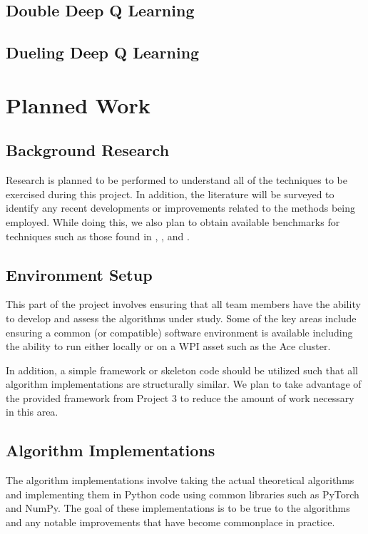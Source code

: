 \documentclass[conference]{IEEEtran}
\begin{document}
\subsection{Double Deep Q Learning}

\subsection{Dueling Deep Q Learning}

\section{Planned Work}

\subsection{Background Research}
Research is planned to be performed to understand all of the techniques to be exercised during this project.
In addition, the literature will be surveyed to identify any recent developments or improvements related to the methods being employed.
While doing this, we also plan to obtain available benchmarks for techniques such as those found in \cite{DQNOriginalPaper}, \cite{NatureDeepLearning}, and \cite{bhonker2017playing}.

\subsection{Environment Setup}
This part of the project involves ensuring that all team members have the ability to develop and assess the algorithms under study.
Some of the key areas include ensuring a common (or compatible) software environment is available including the ability to run \cite{nichol2018retro} either locally or on a WPI asset such as the Ace cluster.

In addition, a simple framework or skeleton code should be utilized such that all algorithm implementations are structurally similar.
We plan to take advantage of the provided framework from Project 3 to reduce the amount of work necessary in this area.

\subsection{Algorithm Implementations}
The algorithm implementations involve taking the actual theoretical algorithms and implementing them in Python code using common libraries such as PyTorch and NumPy.
The goal of these implementations is to be true to the algorithms and any notable improvements that have become commonplace in practice.
\end{document}
